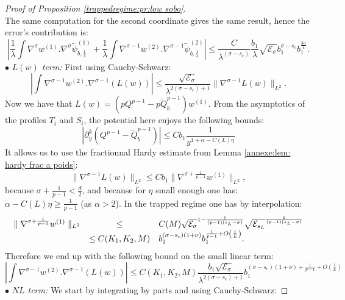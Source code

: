 \documentclass[11pt,a4paper,reqno]{amsart}
\theoremstyle{remark}
\numberwithin{equation}{section}
\begin{document}
\begin{proof}[Proof of Proposition \ref{trappedregime:pr:low sobo}]
$$$$
The same computation for the second coordinate gives the same result, hence the error's contribution is:
\begin{equation} \label{thetrapped:lowsobo:eq:estimation psib}
\left| \frac{1}{\lambda}\int \nabla^{\sigma}w^{(1)}.\nabla^{\sigma}\tilde{\psi}_{b,\frac{1}{\lambda}}^{(1)} +\frac{1}{\lambda}\int \nabla^{\sigma-1}w^{(2)}.\nabla^{\sigma-1}\tilde{\psi}_{b,\frac{1}{\lambda}}^{(2)}\right| \leq \frac{C}{\lambda^{(\sigma-s_c)}}\frac{b_1}{\lambda}\sqrt{\mathcal{E}_{\sigma}}b_1^{\sigma-s_c}b_1^{\frac{3\alpha}{4}} .
\end{equation}
$\bullet$ \emph{$L(w)$ term:} First using Cauchy-Schwarz:
$$
\left| \int \nabla^{\sigma-1}w^{(2)}.\nabla^{\sigma-1}(L(w))\right|\leq \frac{\sqrt{\mathcal{E}_{\sigma}}}{\lambda^{2(\sigma-s_c)+1}}\parallel \nabla^{\sigma-1}L(w) \parallel_{L^2}.
$$
Now we have that $L(w)=(pQ^{p-1}-p\tilde{Q}_b^{p-1})w^{(1)}$. From the asymptotics of the profiles $T_i$ and $S_i$, the potential here enjoys the following bounds:
\begin{equation} \label{thetrapped=lowsobo:eq:asymptotique L}
\left| \partial_y^k (Q^{p-1}-\tilde{Q}_b^{p-1}) \right| \leq Cb_1 \frac{1}{y^{1+\alpha-C(L)\eta}}
\end{equation}
It allows us to use the fractionnal Hardy estimate from Lemma \ref{annexe:lem: hardy frac a poids}:
$$
\parallel \nabla^{\sigma-1}L(w) \parallel_{L^2}\leq C b_1 \parallel \nabla^{\sigma +\frac{1}{p-1}} w^{(1)}\parallel_{L^2},
$$
because $\sigma +\frac{1}{p-1}<\frac{d}{2}$, and because for $\eta$ small enough one has: $\alpha- C(L)\eta\geq \frac{1}{p-1}$ (as $\alpha>2$). In the trapped regime one has by interpolation:
$$
\begin{array}{r c l}
\parallel \nabla^{\sigma +\frac{1}{p-1}}w^{(1)}\parallel_{L^2}&\leq& C(M)\sqrt{\mathcal{E}_{\sigma}}^{1-\frac{1}{(p-1)(s_L-\sigma)}}\sqrt{\mathcal{E}_{s_L}}^{\frac{1}{(p-1)(s_L-\sigma)}} \\
&\leq C(K_1,K_2,M) & b_1^{(\sigma-s_c)(1+\nu)}b_1^{\frac{1}{p-1}+O\left( \frac{1}{L}\right)}.
\end{array}
$$
Therefore we end up with the following bound on the small linear term:
\begin{equation} \label{thetrapped:lowsobo:eq:estimation L}
\left| \int \nabla^{\sigma-1}w^{(2)}.\nabla^{\sigma-1}(L(w))\right|\leq C(K_1,K_2,M) \frac{b_1\sqrt{\mathcal{E}_{\sigma}}}{\lambda^{2(\sigma-s_c)+1}}b_1^{(\sigma-s_c)(1+\nu)+\frac{1}{p-1}+O\left(\frac{1}{L} \right)} 
\end{equation}
$\bullet$ \emph{$NL$ term:} We start by integrating by parts and using Cauchy-Schwarz:

\end{proof}
\end{document}

